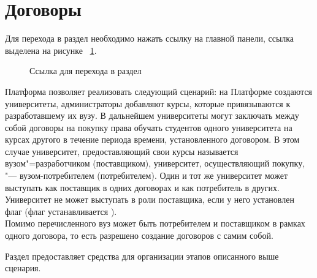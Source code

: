 \graphicspath{{images/agreement/}}

\section{Договоры}
Для перехода в раздел необходимо нажать ссылку  на главной панели, ссылка выделена на рисунке ~\ref{agreement:agreement_section}.
\begin{figure}[H]
	\caption{Ссылка для перехода в раздел }
	\label{agreement:agreement_section}
\end{figure}
Платформа позволяет реализовать следующий сценарий: на Платформе создаются университеты, администраторы добавляют курсы, которые привязываются к разработавшему их вузу. В дальнейшем университеты могут заключать между собой договоры на покупку права обучать студентов одного университета на курсах другого в течение периода времени, установленного договором. В этом случае университет, предоставляющий свои курсы называется вузом"=разработчиком (поставщиком), университет, осуществляющий покупку, "--- вузом-потребителем (потребителем). Один и тот же университет может выступать как поставщик в одних договорах и как потребитель в других.\\
Университет не может выступать в роли поставщика, если у него установлен флаг  (флаг устанавливается ).\\
Помимо перечисленного вуз может быть потребителем и поставщиком в рамках одного договора, то есть разрешено создание договоров с самим собой.

Раздел  предоставляет средства для организации этапов описанного выше сценария.


